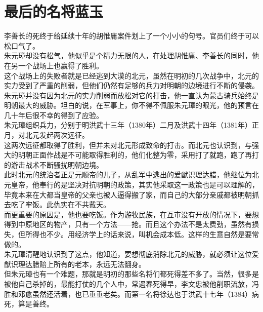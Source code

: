 \section{最后的名将蓝玉}
\ifnum{}
	\begin{multicols}{\theparacolNo}
\fi
李善长的死终于给延续十年的胡惟庸案件划上了一个小小的句号。官员们终于可以松口气了。\\

朱元璋却没有松气，他似乎是个精力无限的人，在处理胡惟庸、李善长的同时，他在另一个战场上也赢得了胜利。\\

这个战场上的失败者就是已经逃到大漠的北元，虽然在明初的几次战争中，北元的实力受到了严重的削弱，但他们仍然有足够的兵力对明朝的边境进行不断的侵袭。\\

朱元璋并没有因为北元的实力削弱而放松对它的打击，他一直认为蒙古骑兵始终是明朝最大的威胁。坦白的说，在军事上，你不得不佩服朱元璋的眼光，他的预言在几十年后很不幸的得到了应验。\\

朱元璋组织兵力，分别于明洪武十三年（1380年）二月及洪武十四年（1381年）正月，对北元发起两次远征。\\

这两次远征都取得了胜利，但并未对北元形成致命的打击。而北元也认识到，与强大的明朝正面作战是不可能取得胜利的，他们化整为零，采用打了就跑，跑了再打的游击战术不断骚扰明朝边境。\\

此时北元的统治者正是元顺帝的儿子，从乱军中逃出的爱猷识理达腊，他继位为北元皇帝，他奉行的是坚决对抗明朝的政策，其实他采取这一政策也是可以理解的，毕竟本来在大都当皇帝的父亲也被人逼得搬了家，而自己的大部分亲戚都被明朝抓去吃了牢饭。此仇实在不共戴天。\\

而更重要的原因是，他也要吃饭。作为游牧民族，在互市没有开放的情况下，要想得到中原地区的物产，只有一个方法——抢。而且这个办法不是太费劲，虽然有损失，但所得也不少。用经济学上的话来说，叫机会成本低。这样的生意自然是要常做的。\\

朱元璋清醒地认识到了这点，他知道，要想彻底消除北元的威胁，就必须让这位爱猷识理达腊赔上所有的老本，永远无法翻身。\\

但朱元璋也有一个难题，那就是明初的那些名将们都死得差不多了。当然，很多是被他自己杀掉的，最能打仗的几个人中，常遇春死得早，李文忠被他削职流放，冯胜和邓愈虽然还活着，也已垂垂老矣。而第一名将徐达也于洪武十七年（1384）病死，算是善终。\\


\end{multicols}
